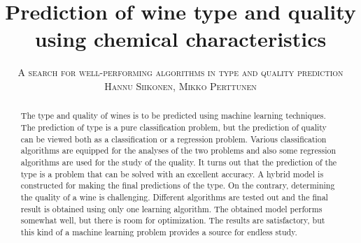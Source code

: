 \documentclass[twoside]{article}
\title{\vspace{-15mm}\fontsize{24pt}{10pt}\selectfont\textbf{Prediction of wine type and quality using chemical characteristics}}
\author{
\large
\textsc{A search for well-performing algorithms in type and quality prediction}\\[2mm]
\textsc{Hannu Siikonen, Mikko Perttunen}\\[2mm]
\vspace{-5mm}
}
\date{}
\begin{document}
\maketitle %


\begin{abstract}
The type and quality of wines is to be predicted using machine learning techniques. The prediction
of type is a pure classification problem, but the prediction of quality can be viewed both as
a classification or a regression problem. Various classification algorithms are equipped
for the analyses of the two problems and also some regression algorithms are used for the study
of the quality. It turns out that the prediction of the type is a problem that can be solved
with an excellent accuracy. A hybrid model is constructed for making the final predictions
of the type. On the contrary, determining the quality of a wine is challenging. Different
algorithms are tested out and the final result is obtained using only one learning
algorithm. The obtained model performs somewhat well, but there is room for optimization. 
The results are satisfactory, but this kind of a machine learning problem provides a source
for endless study.

\end{abstract}

\end{document}

